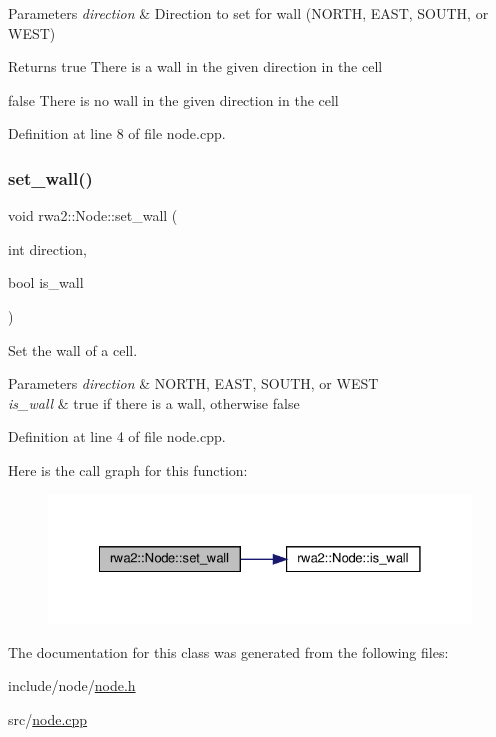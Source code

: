\begin{DoxyParams}{Parameters}
{\em direction} & Direction to set for wall (N\+O\+R\+TH, E\+A\+ST, S\+O\+U\+TH, or W\+E\+ST) \\
\hline
\end{DoxyParams}
\begin{DoxyReturn}{Returns}
true There is a wall in the given direction in the cell 

false There is no wall in the given direction in the cell 
\end{DoxyReturn}


Definition at line 8 of file node.\+cpp.

\mbox{\label{classrwa2_1_1_node_a9e887221d02616392f572dd4018b71ed}} 
\subsubsection{\texorpdfstring{set\+\_\+wall()}{set\_wall()}}
{\footnotesize\ttfamily void rwa2\+::\+Node\+::set\+\_\+wall (\begin{DoxyParamCaption}\item[{int}]{direction,  }\item[{bool}]{is\+\_\+wall }\end{DoxyParamCaption})}



Set the wall of a cell. 


\begin{DoxyParams}{Parameters}
{\em direction} & N\+O\+R\+TH, E\+A\+ST, S\+O\+U\+TH, or W\+E\+ST \\
\hline
{\em is\+\_\+wall} & true if there is a wall, otherwise false \\
\hline
\end{DoxyParams}


Definition at line 4 of file node.\+cpp.

Here is the call graph for this function\+:
\nopagebreak
\begin{figure}[H]
\begin{center}
\leavevmode
\includegraphics[width=328pt]{classrwa2_1_1_node_a9e887221d02616392f572dd4018b71ed_cgraph}
\end{center}
\end{figure}


The documentation for this class was generated from the following files\+:\begin{DoxyCompactItemize}
\item 
include/node/\hyperlink{node_8h}{node.\+h}\item 
src/\hyperlink{node_8cpp}{node.\+cpp}\end{DoxyCompactItemize}
